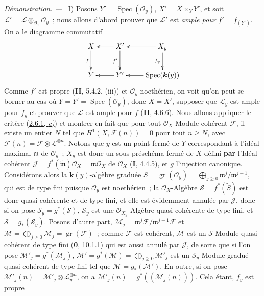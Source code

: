 \documentclass[10pt,oneside]{book}
\newenvironment{proof}{%
  \par\medskip\noindent\textit{Démonstration. ---\ }}{\par}
\begin{document}
\begin{proof}
\noindent I) Posons
$Y'=\operatorname{Spec}(\mathcal O_y)$, $X'=X\times_YY'$, et soit
$\mathcal L'=\mathcal L\otimes_{\mathcal O_Y}\mathcal O_y$~;
nous allons d'abord prouver que $\mathcal L'$ est \emph{ample pour}
$f'=f_{(Y')}$. On a le diagramme commutatif
\[
\xymatrix{
X\ar[d]_f & X'\ar[l]\ar[d]_{f'} & X_y\ar[l]\ar[d]_{f_y}\\
Y & Y'\ar[l] & \operatorname{Spec}(\boldsymbol{k}(y))\ar[l]
}
\]
Comme $f'$ est propre (\textbf{II}, 5.4.2, (iii)) et $\mathcal O_y$ noethérien, on
voit qu'on peut se borner au cas où
$Y=Y'=\operatorname{Spec}(\mathcal O_y)$, donc $X=X'$, supposer que
$\mathcal L_y$ est ample pour $f_y$ et prouver que $\mathcal L$ est ample
pour $f$ (\textbf{II}, 4.6.6). Nous allons appliquer le critère
(\hyperref[III.2.6.1-fr]{2.6.1, \emph{c)}}) et montrer en fait que pour tout
$\mathcal O_X$-Module cohérent $\mathcal F$, il existe un entier $N$ tel que
$H^1(X,\mathcal F(n))=0$ pour tout $n\geq N$, avec
$\mathcal F(n)=\mathcal F\otimes\mathcal L^{\otimes n}$.
Notons que $y$ est un point fermé de $Y$ correspondant à l'idéal maximal
$\mathfrak m$ de $\mathcal O_y$~; $X_y$ est donc un sous-préschéma fermé de
$X$ défini \textbf{par} l'Idéal cohérent
$\mathcal J=f^*(\widetilde{\mathfrak m})\mathcal O_X=
\mathfrak m\mathcal O_X$ de $\mathcal O_X$ (\textbf{I}, 4.4.5), et $g$ l'injection
canonique. Considérons alors la $\boldsymbol{k}(y)$-algèbre graduée
$S=\operatorname{gr}(\mathcal O_y)
=\bigoplus_{j\geq0}\mathfrak m^j/\mathfrak m^{j+1}$,
qui est de type fini puisque $\mathcal O_y$ est noethérien~; la
$\mathcal O_X$-Algèbre $\mathcal S=f^*(\widetilde S)$ est donc
quasi-cohérente et de type fini, et elle est évidemment annulée par
$\mathcal J$, donc si on pose $\mathcal S_y=g^*(\mathcal S)$,
$\mathcal S_y$ est une $\mathcal O_{X_y}$-Algèbre quasi-cohérente de type
fini, et $\mathcal S=g_*(\mathcal S_y)$. Posons d'autre part,
$\mathcal M_j=\mathfrak m^j\mathcal F/\mathfrak m^{j+1}\mathcal F$ et
$\mathcal M=\bigoplus_{j\geq0}\mathcal M_j
=\operatorname{gr}(\mathcal F)$~;
comme $\mathcal F$ est cohérent, $\mathcal M$ est un $\mathcal S$-Module
quasi-cohérent de type fini (\textbf{0}, 10.1.1) qui est aussi annulé par
$\mathcal J$, de sorte que si l'on pose
$\mathcal M'_j=g^*(\mathcal M_j)$, $\mathcal M'=g^*(\mathcal M)=\bigoplus_{j\geq0}\mathcal M'_j$
est un $\mathcal S_y$-Module gradué quasi-cohérent de type
fini tel que $\mathcal M=g_*(\mathcal M')$. En outre, si on pose
$\mathcal M'_j(n)=\mathcal M'_j\otimes\mathcal L_y^{\otimes n}$, on a
$\mathcal M'_j(n)=g^*((\mathcal M_j(n)))$. Cela étant, $f_y$ est propre

\end{proof}
\end{document}
